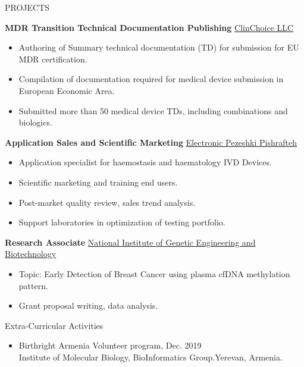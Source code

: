 \documentclass{resume}
\begin{document}
\begin{rSection}{PROJECTS}
\vspace{-1.25em}
\item \textbf{MDR Transition Technical Documentation Publishing} \hfill \href{https://clinchoice.com/solutions/medical-device-regulatory-affairs/technical-document-submission-approval-preparation/}{ClinChoice LLC}
\begin{itemize}
    \itemsep -3pt {} 
     \item Authoring of Summary technical documentation (TD) for submission for EU MDR certification.
     \item Compilation of documentation required for medical device submission in European Economic Area.
     \item Submitted more than 50 medical device TDs, including combinations and biologics.
 \end{itemize}

\item \textbf{Application Sales and Scientific Marketing} \hfill {\href{https://www.sysmex-europe.com/products/diagnostics/haemostasis.html}{Electronic Pezeshki Pishrafteh}}
\begin{itemize}
    \itemsep -3pt {} 
     \item Application specialist for haemostasis and haematology IVD Devices.
     \item Scientific marketing and training end users.
     \item Post-market quality review, sales trend analysis.
     \item Support laboratories in optimization of testing portfolio.
 \end{itemize}
 
\item \textbf{Research Associate} \hfill \href{http://www.nigeb.ac.ir/web/en}{National Institute of Genetic Engineering and Biotechnology}
\begin{itemize}
    \itemsep -3pt {} 
     \item Topic: Early Detection of Breast Cancer using plasma cfDNA methylation pattern.
     \item Grant proposal writing, data analysis.
 \end{itemize}
\end{rSection}

\begin{rSection}{Extra-Curricular Activities} 
\begin{itemize}
   \item 	Birthright Armenia Volunteer program, \hfill Dec. 2019\\
   Institute of Molecular Biology, BioInformatics Group.\hfill Yerevan, Armenia.
   \end{itemize}
\end{rSection}
\end{document}
